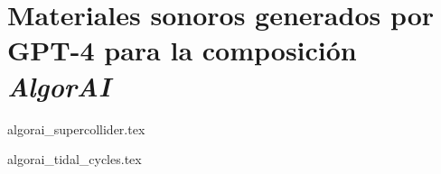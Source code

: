 \chapter{Materiales sonoros generados por GPT-4 para la composición \emph{AlgorAI}}
\label{anexo:algorai}

{algorai_supercollider.tex}

{algorai_tidal_cycles.tex}

